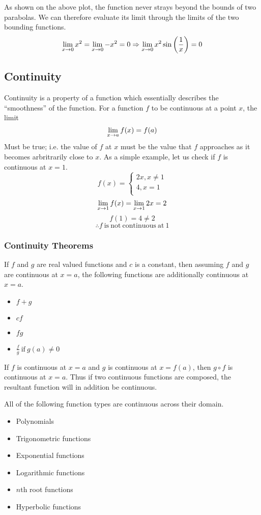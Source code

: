 \documentclass[12pt]{report}
\begin{document}
\begin{flushleft}
As shown on the above plot, the function never strays beyond the bounds of
two parabolas. We can therefore evaluate its limit through the limits of the
two bounding functions.
\[\lim\limits_{x\rightarrow0}x^2 = \lim\limits_{x\rightarrow0} -x^2 = 0
\Rightarrow \lim\limits_{x\rightarrow0} x^2\sin\left(\frac{1}{x}\right) = 0\]

\subsection*{Continuity}
Continuity is a property of a function which essentially describes the 
``smoothness'' of the function. For a function \(f\) to be continuous at a 
point \(x\), the limit
\[\lim\limits_{x\rightarrow a}f(x) = f(a)\]
Must be true; i.e. the value of \(f\) at \(x\) must be the value that \(f\) 
approaches as it becomes arbritrarily close to \(x\). As a simple example, let
us check if \(f\) is continuous at \(x = 1\).
\[f(x) = 
    \begin{cases}
        2x, x \neq 1 \\
        4, x = 1 \\
    \end{cases}
\]
\[\lim\limits_{x\rightarrow1} f(x) = \lim\limits_{x\rightarrow1} 2x = 2\]
\[f(1) = 4 \neq 2\]
\[\therefore f \mathrm{\:is\:not\:continuous\:at\:}1\]

\subsubsection*{Continuity Theorems}
If \(f\) and \(g\) are real valued functions and \(c\) is a constant, then
assuming \(f\) and \(g\) are continuous at \(x = a\), the following functions
are additionally continuous at \(x = a\).
\begin{itemize}
    \item \(f + g\)
    \item \(cf\)
    \item \(fg\)
    \item \(\frac{f}{g} \mathrm{\:if\:} g(a) \neq 0\)
\end{itemize}
If \(f\) is continuous at \(x = a\) and \(g\) is continuous at \(x = f(a)\),
then \(g \circ f\) is continuous at \(x = a\). Thus if two continuous functions
are composed, the resultant function will in addition be continuous.

\bigskip
All of the following function types are continuous across their domain.
\begin{itemize}
    \item Polynomials
    \item Trigonometric functions
    \item Exponential functions
    \item Logarithmic functions
    \item \(n\)th root functions
    \item Hyperbolic functions
\end{itemize}


\end{flushleft}
\end{document}
